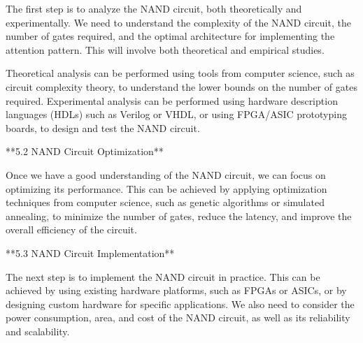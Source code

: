 The first step is to analyze the NAND circuit, both theoretically and experimentally. We need to understand the complexity of the NAND circuit, the number of gates required, and the optimal architecture for implementing the attention pattern. This will involve both theoretical and empirical studies.













Theoretical analysis can be performed using tools from computer science, such as circuit complexity theory, to understand the lower bounds on the number of gates required. Experimental analysis can be performed using hardware description languages (HDLs) such as Verilog or VHDL, or using FPGA/ASIC prototyping boards, to design and test the NAND circuit.













**5.2 NAND Circuit Optimization**













Once we have a good understanding of the NAND circuit, we can focus on optimizing its performance. This can be achieved by applying optimization techniques from computer science, such as genetic algorithms or simulated annealing, to minimize the number of gates, reduce the latency, and improve the overall efficiency of the circuit.













**5.3 NAND Circuit Implementation**













The next step is to implement the NAND circuit in practice. This can be achieved by using existing hardware platforms, such as FPGAs or ASICs, or by designing custom hardware for specific applications. We also need to consider the power consumption, area, and cost of the NAND circuit, as well as its reliability and scalability.













